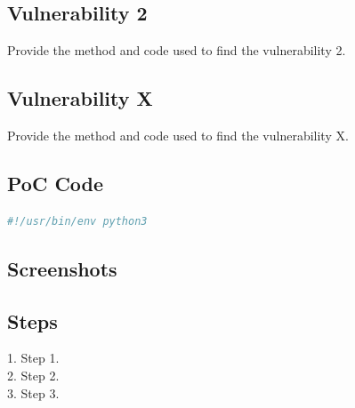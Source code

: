 \documentclass[a4paper]{article}
\begin{document}
\subsection{Vulnerability 2}
Provide the method and code used to find the vulnerability 2.

\subsection{Vulnerability X}
Provide the method and code used to find the vulnerability X.

\subsection{PoC Code}

\begin{lstlisting}[language=Python]
#!/usr/bin/env python3

\end{lstlisting}


\subsection{Screenshots}


\subsection{Steps}
1. Step 1.\\
2. Step 2.\\
3. Step 3.


\clearpage
\end{document}
